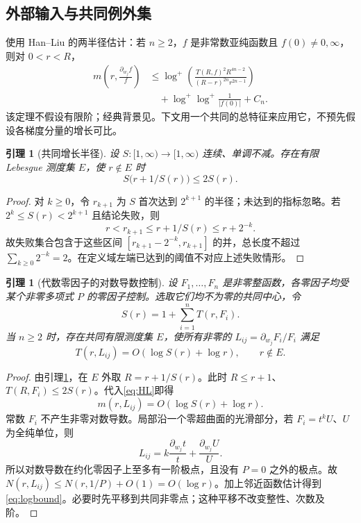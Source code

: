 \documentclass[UTF8,11pt,a4paper,fontset=fandol]{ctexart}
\newtheorem{lemma}[theorem]{引理}
\theoremstyle{definition}\newtheorem{definition}[theorem]{定义}
\theoremstyle{remark}\newtheorem{remark}[theorem]{注}
\begin{document}
\subsection{外部输入与共同例外集}
使用 Han--Liu\cite[Theorem 1.1]{HanLiu2025} 的两半径估计：若 $n\ge2$，$f$ 是非常数亚纯函数且 $f(0)\ne0,\infty$，则对 $0<r<R$，
\begin{equation}\label{eq:HL}
\begin{split}
m\left(r,\frac{\partial_{w_j}f}{f}\right)
&\le\log^+\!\left(\frac{T(R,f)^2R^{4n-2}}{(R-r)^{2n}r^{2n-1}}\right)\\
&\quad+\log^+\log^+\frac1{|f(0)|}+C_n.
\end{split}
\end{equation}
该定理不假设有限阶；经典背景见\cite{Vitter1977}。下文用一个共同的总特征来应用它，不预先假设各梯度分量的增长可比。

\begin{lemma}[共同增长半径]\label{lem:borel}
设 $S:[1,\infty)\to[1,\infty)$ 连续、单调不减。存在有限 Lebesgue 测度集 $E$，使 $r\notin E$ 时
\[
S\bigl(r+1/S(r)\bigr)\le2S(r).
\]
\end{lemma}
\begin{proof}
对 $k\ge0$，令 $r_{k+1}$ 为 $S$ 首次达到 $2^{k+1}$ 的半径；未达到的指标忽略。若 $2^k\le S(r)<2^{k+1}$ 且结论失败，则
\[
r<r_{k+1}\le r+1/S(r)\le r+2^{-k}.
\]
故失败集合包含于这些区间 $[r_{k+1}-2^{-k},r_{k+1}]$ 的并，总长度不超过 $\sum_{k\ge0}2^{-k}=2$。在定义域左端已达到的阈值不对应上述失败情形。
\end{proof}

\begin{lemma}[代数零因子的对数导数控制]\label{lem:log}
设 $F_1,\ldots,F_n$ 是非零整函数，各零因子均受某个非零多项式 $P$ 的零因子控制。选取它们均不为零的共同中心，令
\[
S(r)=1+\sum_{i=1}^nT(r,F_i).
\]
当 $n\ge2$ 时，存在共同有限测度集 $E$，使所有非零的 $L_{ij}=\partial_{w_j}F_i/F_i$ 满足
\begin{equation}\label{eq:logbound}
T(r,L_{ij})=O(\log S(r)+\log r),\qquad r\notin E.
\end{equation}
\end{lemma}
\begin{proof}
由引理\ref{lem:borel}，在 $E$ 外取 $R=r+1/S(r)$。此时 $R\le r+1$、$T(R,F_i)\le2S(r)$。代入\eqref{eq:HL}即得
\[
m(r,L_{ij})=O(\log S(r)+\log r).
\]
常数 $F_i$ 不产生非零对数导数。局部沿一个零超曲面的光滑部分，若 $F_i=t^kU$、$U$ 为全纯单位，则
\[
L_{ij}=k\frac{\partial_{w_j}t}{t}+\frac{\partial_{w_j}U}{U}.
\]
所以对数导数在约化零因子上至多有一阶极点，且没有 $P=0$ 之外的极点。故 $N(r,L_{ij})\le N(r,1/P)+O(1)=O(\log r)$。加上邻近函数估计得到\eqref{eq:logbound}。必要时先平移到共同非零点；这种平移不改变整性、次数及阶。
\end{proof}
\end{document}
